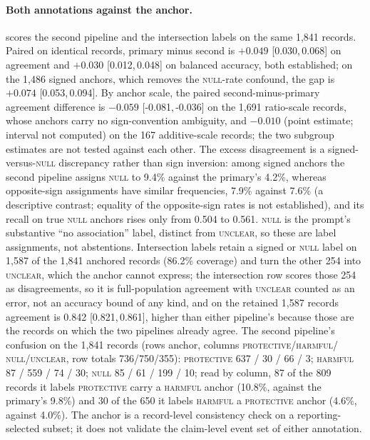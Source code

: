 \documentclass[11pt]{article}
\newcommand{\ci}[2]{[#1,\,#2]}
\begin{document}
\paragraph{Both annotations against the anchor.}  scores the second pipeline and
the intersection labels on the same 1{,}841 records. Paired on identical records, primary minus
second is $+0.049$ \ci{0.030}{0.068} on agreement and $+0.030$ \ci{0.012}{0.048} on balanced
accuracy, both established; on the 1{,}486 signed anchors, which removes the \textsc{null}-rate
confound, the gap is $+0.074$ \ci{0.053}{0.094}. By anchor scale, the paired second-minus-primary
agreement difference is $-0.059$ \ci{-0.081}{-0.036} on the 1{,}691 ratio-scale records, whose
anchors carry no sign-convention ambiguity, and $-0.010$ (point estimate; interval not computed) on
the 167 additive-scale records; the two subgroup estimates are not tested against each other. The
excess disagreement is a signed-versus-\textsc{null} discrepancy rather than sign inversion: among
signed anchors the second pipeline assigns \textsc{null} to 9.4\% against the primary's 4.2\%,
whereas opposite-sign assignments have similar frequencies, 7.9\% against 7.6\% (a descriptive
contrast; equality of the opposite-sign rates is not established), and its recall on true
\textsc{null} anchors rises only from 0.504 to 0.561. \textsc{null} is the prompt's substantive
``no association'' label, distinct from \textsc{unclear}, so these are label assignments, not
abstentions. Intersection labels retain a signed or \textsc{null} label on 1{,}587 of the 1{,}841
anchored records (86.2\% coverage) and turn the other 254 into \textsc{unclear}, which the anchor
cannot express; the intersection row scores those 254 as disagreements, so it is full-population
agreement with \textsc{unclear} counted as an error, not an accuracy bound of any kind, and on the
retained 1{,}587 records agreement is 0.842 \ci{0.821}{0.861}, higher than either pipeline's
because those are the records on which the two pipelines already agree. The second pipeline's
confusion on the 1{,}841 records (rows anchor, columns \textsc{protective}/\textsc{harmful}/
\textsc{null}/\textsc{unclear}, row totals 736/750/355): \textsc{protective} 637 / 30 / 66 / 3;
\textsc{harmful} 87 / 559 / 74 / 30; \textsc{null} 85 / 61 / 199 / 10; read by column, 87 of the
809 records it labels \textsc{protective} carry a \textsc{harmful} anchor (10.8\%, against the
primary's 9.8\%) and 30 of the 650 it labels \textsc{harmful} a \textsc{protective} anchor (4.6\%,
against 4.0\%). The anchor is a record-level consistency check on a reporting-selected subset; it
does not validate the claim-level event set of either annotation.
\end{document}
